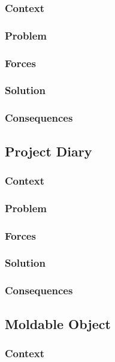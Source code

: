 \documentclass[sigconf]{acmart}
\begin{document}
\subsubsection*{Context}
\subsubsection*{Problem}
\subsubsection*{Forces}
\subsubsection*{Solution}
\subsubsection*{Consequences}


\subsection{Project Diary}
\subsubsection*{Context}
\subsubsection*{Problem}
\subsubsection*{Forces}
\subsubsection*{Solution}
\subsubsection*{Consequences}


\subsection{Moldable Object}
\subsubsection*{Context}
\end{document}
